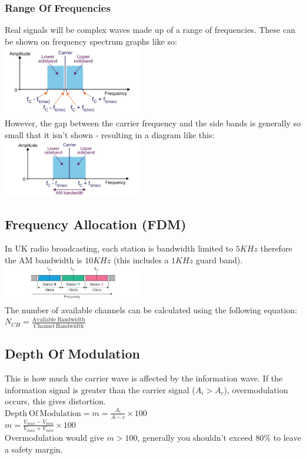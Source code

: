\documentclass[a4paper,11pt, twocolumn]{article}
\begin{document}
\subsubsection{Range Of Frequencies}
Real signals will be complex waves made up of a range of frequencies. These can be shown on frequency spectrum graphs like so:\\
\includegraphics[width=0.45\textwidth]{rangeFreqSpec.jpg}\\
However, the gap between the carrier frequency and the side bands is generally so small that it isn't shown - resulting in a diagram like this:\\
\includegraphics[width=0.45\textwidth]{amBandwidth.jpg}
\subsection{Frequency Allocation (FDM)}
In UK radio broadcasting, each station is bandwidth limited to $5KHz$ therefore the AM bandwidth is $10KHz$ (this includes a $1KHz$ guard band).\\
\includegraphics[width=0.45\textwidth]{fdm.jpg}\\
The number of available channels can be calculated using the following equation:\\
$\displaystyle N_{CH} = \frac{\mathrm{Available\ Bandwidth}}{\mathrm{Channel\ Bandwidth}}$
\subsection{Depth Of Modulation}
This is how much the carrier wave is affected by the information wave. If the information signal is greater than the carrier signal ($A_i>A_c$), overmodulation occurs, this gives distortion. \\
$\displaystyle \mathrm{Depth\ Of\ Modulation} = m = \frac{A_i}{A-c}\times 100$\\
$\displaystyle m=\frac{V_{max} - V_{min}}{V_{max} + V_{min}} \times 100$\\
Overmodulation would give $m>100$, generally you shouldn't exceed $80\%$ to leave a safety margin.
\end{document}
